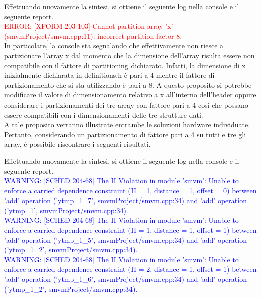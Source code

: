 

Effettuando nuovamente la sintesi, si ottiene il seguente log nella console e il seguente report.
\\
\textcolor{red}{ERROR: [XFORM 203-103] Cannot partition array 'x' (smvmProject/smvm.cpp:11): incorrect partition factor 8.}
\\
In particolare, la console sta segnalando che effettivamente non riesce a partizionare l'array x dal momento che la dimensione dell'array risulta essere non compatibile con il fattore di partitioning dichiarato. Infatti, la dimensione di x inizialmente dichiarata in definitions.h è pari a 4 mentre il fattore di partizionamento che si sta utilizzando è pari a 8. A questo proposito si potrebbe modificare il valore di dimensionamento relativo a x all'interno dell'header oppure considerare i partizionamenti dei tre array con fattore pari a 4 così che possano essere compatibili con i dimensionamenti delle tre strutture dati. 
\\
A tale proposito verranno illustrate entrambe le soluzioni hardware individuate. Pertanto, considerando un partizionamento di fattore pari a 4 su tutti e tre gli array, è possibile riscontrare i seguenti risultati.



Effettuando nuovamente la sintesi, si ottiene il seguente log nella console e il seguente report.
\\
\textcolor{blue}{WARNING: [SCHED 204-68] The II Violation in module 'smvm': Unable to enforce a carried dependence constraint (II = 1, distance = 1, offset = 0)
	between 'add' operation ('ytmp\_1\_7', smvmProject/smvm.cpp:34) and 'add' operation ('ytmp\_1', smvmProject/smvm.cpp:34).}
\\
\textcolor{blue}{WARNING: [SCHED 204-68] The II Violation in module 'smvm': Unable to enforce a carried dependence constraint (II = 1, distance = 1, offset = 1)
	between 'add' operation ('ytmp\_1\_5', smvmProject/smvm.cpp:34) and 'add' operation ('ytmp\_1\_2', smvmProject/smvm.cpp:34).}
\\
\textcolor{blue}{WARNING: [SCHED 204-68] The II Violation in module 'smvm': Unable to enforce a carried dependence constraint (II = 2, distance = 1, offset = 1)
	between 'add' operation ('ytmp\_1\_6', smvmProject/smvm.cpp:34) and 'add' operation ('ytmp\_1\_2', smvmProject/smvm.cpp:34).}
\\

